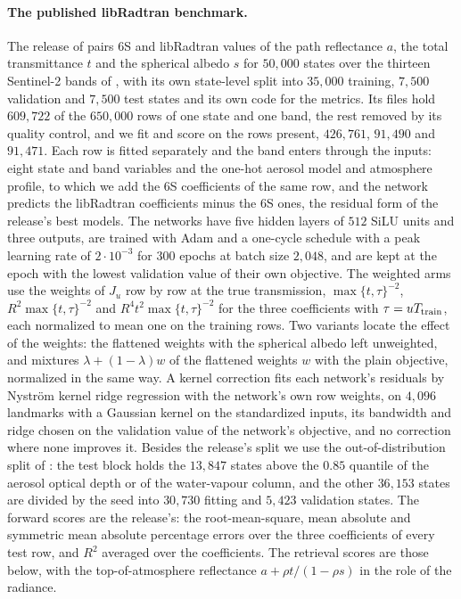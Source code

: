\documentclass[11pt]{article}
\theoremstyle{remark}
\newcommand{\1}{\mathbf{1}}
\begin{document}
\paragraph{The published libRadtran benchmark.} The release of \cite{pkan} pairs 6S and libRadtran values of the path
reflectance $a$, the total transmittance $t$ and the spherical albedo $s$ for $50{,}000$ states over the thirteen
Sentinel-2 bands of \cite{drusch2012}, with its own state-level split into $35{,}000$ training, $7{,}500$ validation and
$7{,}500$ test states and its own code for the metrics. Its files hold $609{,}722$ of the $650{,}000$ rows of one state
and one band, the rest removed by its quality control, and we fit and score on the rows present, $426{,}761$, $91{,}490$
and $91{,}471$. Each row is fitted separately and the band enters through the
inputs: eight state and band variables and the one-hot aerosol model and atmosphere profile, to which we add the 6S
coefficients of the same row, and the network predicts the libRadtran coefficients minus the 6S ones, the residual form
of the release's best models. The networks have five hidden layers of $512$ SiLU units \cite{silu} and three outputs,
are trained with Adam \cite{adam} and a one-cycle schedule \cite{onecycle} with a peak learning rate of $2\cdot10^{-3}$
for $300$ epochs at batch size $2{,}048$, and are kept at the epoch with the lowest validation value of their own
objective. The weighted arms use the weights of
$J_u$ row by row at the true transmission, $\max\{t,\tau\}^{-2}$, $R^2\max\{t,\tau\}^{-2}$ and $R^4t^2\max\{t,\tau\}^{-2}$
for the three coefficients with $\tau=uT_{\rm train}$, each normalized to mean one on the training rows. Two variants
locate the effect of the weights: the flattened weights with the spherical albedo left unweighted, and mixtures
$\lambda+(1-\lambda)w$ of the flattened weights $w$ with the plain objective, normalized in the same way. A kernel
correction fits each network's residuals by Nystr\"om kernel ridge regression \cite{nystrom} with the network's own row
weights, on $4{,}096$ landmarks with a Gaussian kernel on the standardized inputs, its bandwidth and ridge chosen on the
validation value of the network's objective, and no correction where none improves it. Besides the release's split we
use the out-of-distribution split of \cite{shmalo2}: the test block holds the $13{,}847$ states above the $0.85$
quantile of the aerosol optical depth or of the water-vapour column, and the other $36{,}153$ states are divided by the
seed into $30{,}730$ fitting and $5{,}423$ validation states. The forward
scores are the release's: the root-mean-square, mean absolute and symmetric mean absolute percentage errors over the
three coefficients of every test row, and $R^2$ averaged over the coefficients. The retrieval scores are those below,
with the top-of-atmosphere reflectance $a+\rho t/(1-\rho s)$ in the role of the radiance.
\end{document}
